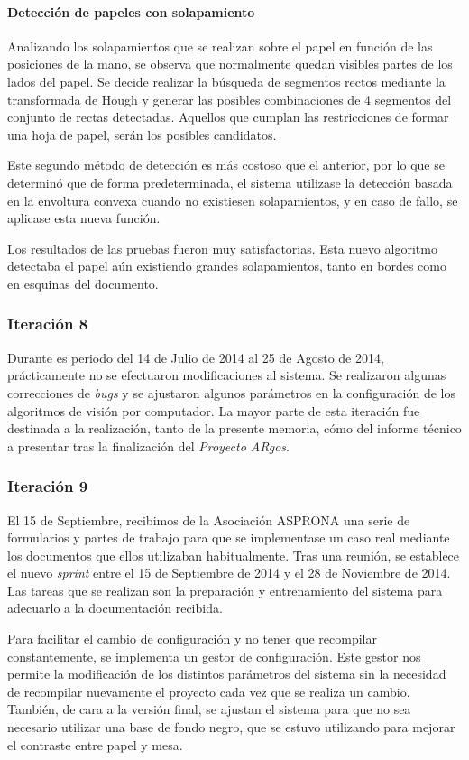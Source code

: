 \paragraph{Detección de papeles con solapamiento}
Analizando los solapamientos que se realizan sobre el papel en función de las posiciones de la mano, se observa que normalmente quedan visibles partes de los lados del papel. Se decide realizar la búsqueda de segmentos rectos mediante la transformada de Hough y generar las posibles combinaciones de 4 segmentos del conjunto de rectas detectadas. Aquellos que cumplan las restricciones de formar una hoja de papel, serán los posibles candidatos.

Este segundo método de detección es más costoso que el anterior, por lo que se determinó que de forma predeterminada, el sistema utilizase la detección basada en la envoltura convexa cuando no existiesen solapamientos, y en caso de fallo, se aplicase esta nueva función. 

Los resultados de las pruebas fueron muy satisfactorias. Esta nuevo algoritmo detectaba el papel aún existiendo grandes solapamientos, tanto en bordes como en esquinas del documento.

\subsubsection{Iteración 8}
Durante es periodo del 14 de Julio de 2014 al 25 de Agosto de 2014, prácticamente no se efectuaron modificaciones al sistema. Se realizaron algunas correcciones de \textit{bugs} y se ajustaron algunos parámetros en la configuración de los algoritmos de visión por computador. La mayor parte de esta iteración fue destinada a la realización, tanto de la presente memoria, cómo del informe técnico a presentar tras la finalización del \textit{Proyecto ARgos}.

\subsubsection{Iteración 9}
El 15 de Septiembre, recibimos de la Asociación ASPRONA una serie de formularios y partes de trabajo para que se implementase un caso real mediante los documentos que ellos utilizaban habitualmente. Tras una reunión, se establece el nuevo \textit{sprint} entre el 15 de Septiembre de 2014 y el 28 de Noviembre de 2014. Las tareas que se realizan son la preparación y entrenamiento del sistema para adecuarlo a la documentación recibida.
 
Para facilitar el cambio de configuración y no tener que recompilar constantemente, se implementa un gestor de configuración. Este gestor nos permite la modificación de los distintos parámetros del sistema sin la necesidad de recompilar nuevamente el proyecto cada vez que se realiza un cambio. También, de cara a la versión final, se ajustan el sistema para que no sea necesario utilizar una base de fondo negro, que se estuvo utilizando para mejorar el contraste entre papel y mesa.

